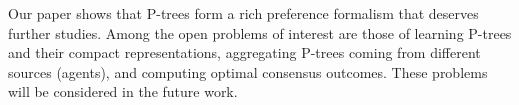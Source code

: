 Our paper shows that P-trees form a rich preference formalism that
deserves further studies. Among the open problems of interest are 
those of learning P-trees and their compact representations, aggregating
P-trees coming from different sources (agents), and computing
optimal consensus outcomes. These problems will be considered in the 
future work. 
